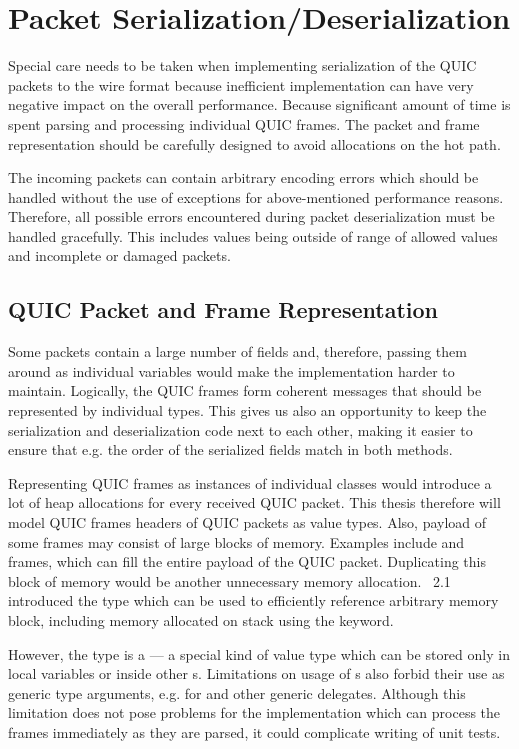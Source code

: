 \section{Packet Serialization/Deserialization}

Special care needs to be taken when implementing serialization of the QUIC packets to the wire
format because inefficient implementation can have very negative impact on the overall performance.
Because significant amount of time is spent parsing and processing individual QUIC frames. The
packet and frame representation should be carefully designed to avoid allocations on the hot path.

The incoming packets can contain arbitrary encoding errors which should be handled without the use
of exceptions for above-mentioned performance reasons. Therefore, all possible errors encountered
during packet deserialization must be handled gracefully. This includes values being outside of
range of allowed values and incomplete or damaged packets.

\subsection{QUIC Packet and Frame Representation}

Some packets contain a large number of fields and, therefore, passing them around as individual
variables would make the implementation harder to maintain. Logically, the QUIC frames form coherent
messages that should be represented by individual \dotnet{} types. This gives us also an opportunity to keep the serialization and deserialization code next to each other, making it easier to ensure that e.g. the order of the serialized fields match in both methods.

Representing QUIC frames as instances of individual classes would introduce a lot of heap
allocations for every received QUIC packet. This thesis therefore will model QUIC frames headers of
QUIC packets as value types. Also, payload of some frames may consist of large blocks of memory.
Examples include \STREAM{} and \CRYPTO{} frames, which can fill the entire payload of the QUIC
packet. Duplicating this block of memory would be another unnecessary memory allocation.
\dotnet{}~2.1 introduced the  type which can be used to efficiently reference
arbitrary memory block, including memory allocated on stack using the  keyword.

However, the  type is a  --- a special kind of value type which can
be stored only in local variables or inside other s. Limitations on usage of
s also forbid their use as generic type arguments, e.g. for  and
other generic delegates. Although this limitation does not pose problems for the \QuicConnection{}
implementation which can process the frames immediately as they are parsed, it could complicate
writing of unit tests.

